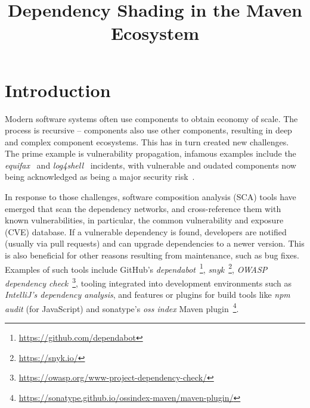\documentclass{article}
\begin{document}
\title{Dependency Shading in the Maven Ecosystem}


\maketitle


\section{Introduction}


Modern software systems often use components to obtain economy of scale. The process is recursive -- components also use other components, resulting in deep and complex component ecosystems. This has in turn created new challenges. The prime example is vulnerability propagation, infamous examples include the \textit{equifax}~\cite{CVE-2017-5638,luszcz2018apache} and \textit{log4shell}~\cite{CVE-2021-44228,hiesgen2022race} incidents, with vulnerable and oudated components now being acknowledged as being a major security risk~\cite{owaspTop10A06}. 

In response to those challenges, software composition analysis (SCA)  tools have emerged that scan the dependency networks, and cross-reference them with known vulnerabilities, in particular, the common vulnerability and exposure (CVE) database. If a vulnerable dependency is found, developers are notified (usually via pull requests) and can upgrade dependencies to a newer version. This is also beneficial for other reasons resulting from maintenance, such as bug fixes. Examples of such tools include GitHub's \textit{dependabot}~\footnote{\url{https://github.com/dependabot}}, \textit{snyk}~\footnote{\url{https://snyk.io/}},
\textit{OWASP dependency check}~\footnote{\url{https://owasp.org/www-project-dependency-check/}},  tooling integrated into development environments such as \textit{IntelliJ's dependency analysis},  and features or plugins for build tools like \textit{npm audit} (for JavaScript) and sonatype's \textit{oss index} Maven plugin~\footnote{\url{https://sonatype.github.io/ossindex-maven/maven-plugin/}}.
 
\end{document}
